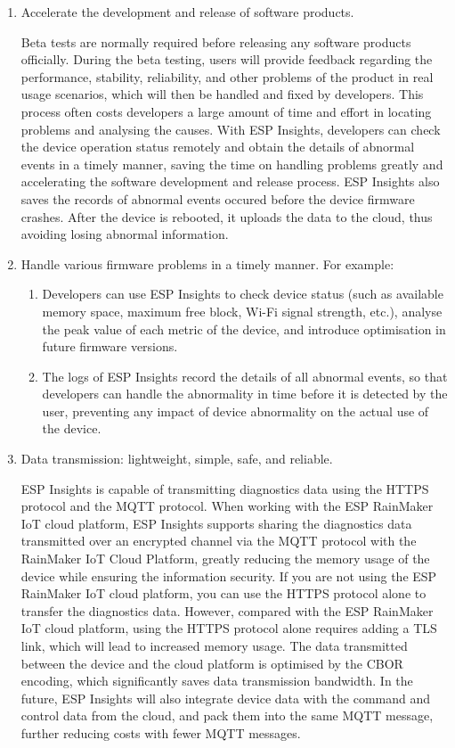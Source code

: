 \documentclass[a4paper,12pt]{book}
\begin{document}
\begin{enumerate}[label=(\arabic*)]
    \item Accelerate the development and release of software products.
    
    Beta tests are normally required before releasing any software products officially. During the beta testing, users will provide feedback regarding the performance, stability, reliability, and other problems of the product in real usage scenarios, which will then be handled and fixed by developers. This process often costs developers a large amount of time and effort in locating problems and analysing the causes. With ESP Insights, developers can check the device operation status remotely and obtain the details of abnormal events in a timely manner, saving the time on handling problems greatly and accelerating the software development and release process. ESP Insights also saves the records of abnormal events occured before the device firmware crashes. After the device is rebooted, it uploads the data to the cloud, thus avoiding losing abnormal information.

    \item Handle various firmware problems in a timely manner. For example:

    \begin{enumerate}[label=\alph*.]
        \item Developers can use ESP Insights to check device status (such as available memory space, maximum free block, Wi-Fi signal strength, etc.), analyse the peak value of each metric of the device, and introduce optimisation in future firmware versions.
        \item The logs of ESP Insights record the details of all abnormal events, so that developers can handle the abnormality in time before it is detected by the user, preventing any impact of device abnormality on the actual use of the device.
    \end{enumerate}

    \item Data transmission: lightweight, simple, safe, and reliable.
    
    ESP Insights is capable of transmitting diagnostics data using the HTTPS protocol and the MQTT protocol. When working with the ESP RainMaker IoT cloud platform, ESP Insights supports sharing the diagnostics data transmitted over an encrypted channel via the MQTT protocol with the RainMaker IoT Cloud Platform, greatly reducing the memory usage of the device while ensuring the information security. If you are not using the ESP RainMaker IoT cloud platform, you can use the HTTPS protocol alone to transfer the diagnostics data. However, compared with the ESP RainMaker IoT cloud platform, using the HTTPS protocol alone requires adding a TLS link, which will lead to increased memory usage. The data transmitted between the device and the cloud platform is optimised by the CBOR encoding, which significantly saves data transmission bandwidth. In the future, ESP Insights will also integrate device data with the command and control data from the cloud, and pack them into the same MQTT message, further reducing costs with fewer MQTT messages.
\end{enumerate}
\end{document}
